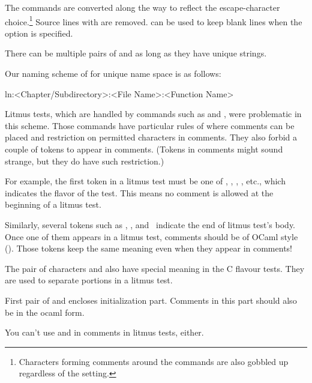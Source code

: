 The \qco{\\lnlbl} commands are converted along the way to reflect
the escape-character choice.\footnote{
	Characters forming comments around the \qco{\\lnlbl} commands
	are also gobbled up regardless of the  setting.
}
Source lines with \qco{\\fcvexclude} are removed.
\qco{\\fcvblank} can be used to keep blank lines when the
 option is specified.

There can be multiple pairs of  and 
as long as they have unique  strings.

Our naming scheme of  for unique name space is as follows:

\begin{VerbatimU}
ln:<Chapter/Subdirectory>:<File Name>:<Function Name>
\end{VerbatimU}

Litmus tests, which are handled by  commands such as
 and , were problematic in this scheme.
Those commands have particular rules of where comments can be
placed and restriction on permitted characters in comments.
They also forbid a couple of tokens to appear in comments.
(Tokens in comments might sound strange, but they do have such restriction.)

For example, the first token in a litmus test must be one of
, , , , etc., which indicates
the flavor of the test.
This means no comment is allowed at the beginning of a litmus test.

Similarly, several tokens such as , ,
and~ indicate the end of litmus test's body.
Once one of them appears in a litmus test, comments should be of
OCaml style ().
Those tokens keep the same meaning even when they appear in comments!

The pair of characters \qco{\{} and \qco{\}} also have special
meaning in the C flavour tests.
They are used to separate portions in a litmus test.

First pair of \qco{\{} and \qco{\}} encloses initialization part.
Comments in this part should also be in the ocaml form.

You can't use \qco{\{} and \qco{\}} in comments in litmus tests, either.

